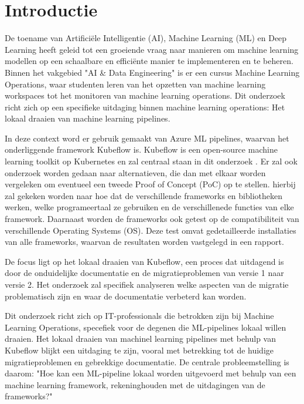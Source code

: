 
\section{Introductie}%
\label{sec:introductie}

De toename van Artificiële Intelligentie (AI), Machine Learning (ML) en Deep Learning heeft geleid tot een groeiende vraag naar manieren om machine learning modellen op een schaalbare en efficiënte manier te implementeren en te beheren.
Binnen het vakgebied "AI \& Data Engineering" is er een cursus Machine Learning Operations, waar studenten leren van het opzetten van machine learning workspaces tot het monitoren van machine learning operations.
Dit onderzoek richt zich op een specifieke uitdaging binnen machine learning operations: Het lokaal draaien van machine learning pipelines.\newline

In deze context word er gebruik gemaakt van Azure ML pipelines, waarvan het onderliggende framework Kubeflow is. Kubeflow is een open-source machine learning toolkit op Kubernetes en zal centraal staan in dit onderzoek \autocite{Kubeflow2021}.
Er zal ook onderzoek worden gedaan naar alternatieven, die dan met elkaar worden vergeleken om eventueel een tweede Proof of Concept (PoC) op te stellen. hierbij zal gekeken worden naar hoe dat de verschillende frameworks en bibliotheken werken, welke programeertaal ze gebruiken en de verschillenede functies van elke framework.
Daarnaast worden de frameworks ook getest op de compatibiliteit van verschillende Operating Systems (OS). Deze test omvat gedetailleerde installaties van alle frameworks, waarvan de resultaten worden vastgelegd in een rapport.\newline

De focus ligt op het lokaal draaien van Kubeflow, een proces dat uitdagend is door de onduidelijke documentatie en de migratieproblemen van versie 1 naar versie 2.
Het onderzoek zal specifiek analyseren welke aspecten van de migratie problematisch zijn en waar de documentatie verbeterd kan worden.\newline

Dit onderzoek richt zich op IT-professionals die betrokken zijn bij Machine Learning Operations, specefiek voor de degenen die ML-pipelines lokaal willen draaien.
Het lokaal draaien van machinel learning pipelines met behulp van Kubeflow blijkt een uitdaging te zijn, vooral met betrekking tot de huidige migratieproblemen en gebrekkige documentatie.
De centrale probleemstelling is daarom: "Hoe kan een ML-pipeline lokaal worden uitgevoerd met behulp van een machine learning framework, rekeninghouden met de uitdagingen van de frameworks?"

